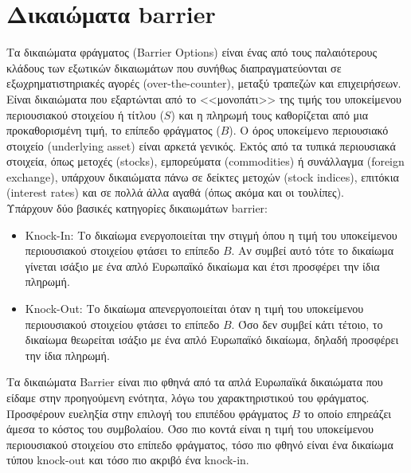 \documentclass[12pt,a4paper,twoside,openany]{book}
\begin{document}
\section{Δικαιώματα barrier } 	
\vspace{2.5mm}
	Τα δικαιώματα φράγματος (Barrier Options) είναι ένας από τους παλαιότερους κλάδους των εξωτικών δικαιωμάτων που συνήθως διαπραγματεύονται σε εξωχρηματιστηριακές αγορές (over-the-counter), μεταξύ τραπεζών και επιχειρήσεων. Είναι δικαιώματα που εξαρτώνται από το <<μονοπάτι>> της τιμής του υποκείμενου περιουσιακού στοιχείου ή τίτλου ($S$) και η πληρωμή τους καθορίζεται από μια προκαθορισμένη τιμή, το επίπεδο φράγματος ($B$). Ο όρος υποκείμενο περιουσιακό στοιχείο (underlying asset) είναι αρκετά γενικός. Εκτός από τα τυπικά περιουσιακά στοιχεία, όπως μετοχές (stocks), εμπορεύματα (commodities) ή συνάλλαγμα (foreign exchange), υπάρχουν δικαιώματα πάνω σε δείκτες μετοχών (stock indices), επιτόκια (interest rates)	και σε πολλά άλλα αγαθά (όπως ακόμα και οι τουλίπες). 
	\vspace{2.5mm}\\
	Υπάρχουν δύο βασικές κατηγορίες δικαιωμάτων barrier:
	\begin{itemize}
		\item {}Knock-In: Το δικαίωμα ενεργοποιείται την στιγμή όπου η τιμή του υποκείμενου περιουσιακού στοιχείου φτάσει το επίπεδο $B$. Αν συμβεί αυτό τότε το δικαίωμα γίνεται ισάξιο με ένα απλό Ευρωπαϊκό δικαίωμα και έτσι προσφέρει την ίδια πληρωμή.
		\item {}Knock-Out: Το δικαίωμα απενεργοποιείται όταν η τιμή του υποκείμενου περιουσιακού στοιχείου φτάσει το επίπεδο $B$. Όσο δεν συμβεί κάτι τέτοιο, το δικαίωμα θεωρείται ισάξιο με ένα απλό Ευρωπαϊκό δικαίωμα, δηλαδή προσφέρει την ίδια πληρωμή.
	\end{itemize}
 	Τα δικαιώματα Barrier είναι πιο φθηνά από τα απλά Ευρωπαϊκά δικαιώματα που είδαμε στην προηγούμενη ενότητα, λόγω του χαρακτηριστικού του φράγματος. Προσφέρουν ευεληξία στην επιλογή του επιπέδου φράγματος $B$ το οποίο επηρεάζει άμεσα το κόστος του συμβολαίου. Όσο πιο κοντά είναι η τιμή του υποκείμενου περιουσιακού στοιχείου στο επίπεδο φράγματος, τόσο πιο φθηνό είναι ένα δικαίωμα τύπου knock-out και τόσο πιο ακριβό ένα knock-in.
\end{document}
